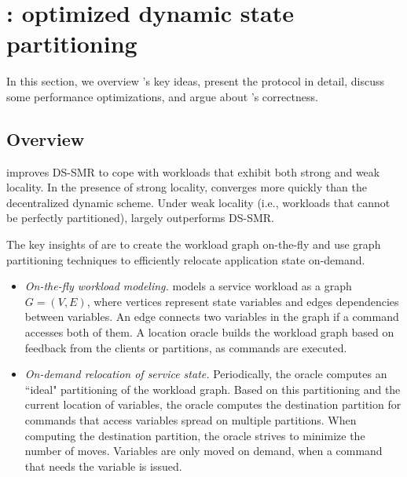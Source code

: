 \section{\dynastar: optimized dynamic state partitioning}
\label{sec:dynastar}

In this section, we overview \dynastar's key ideas, present the protocol in detail, discuss some performance optimizations, and argue about \dynastar's correctness.

\subsection{Overview}

\dynastar improves DS-SMR to cope with workloads that exhibit both strong and weak locality.
In the presence of strong locality, \dynastar converges more quickly than the decentralized dynamic scheme.
Under weak locality (i.e., workloads that cannot be perfectly partitioned), \dynastar largely outperforms DS-SMR.

The key insights of \dynastar are to create the workload graph on-the-fly and use graph partitioning techniques to efficiently relocate application state on-demand.
\begin{itemize}
\item \emph{On-the-fly workload modeling.}
\dynastar models a service workload as a graph $G = (V, E)$, where vertices represent state variables and edges dependencies between variables.
An edge connects two variables in the graph if a command accesses both of them.
A location oracle builds the workload graph based on feedback from the clients or partitions, as commands are executed.
\item \emph{On-demand relocation of service state.}
Periodically, the oracle computes an ``ideal" partitioning of the workload graph.
Based on this partitioning and the current location of variables, the oracle computes the destination partition for commands that access variables spread on multiple partitions.
When computing the destination partition, the oracle strives to minimize the number of moves.
Variables are only moved on demand, when a command that needs the variable is issued.
\end{itemize}




